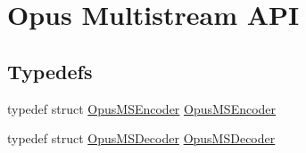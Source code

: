 \hypertarget{group__opus__multistream}{}\section{Opus Multistream A\+PI}
\label{group__opus__multistream}
\subsection*{Typedefs}
\begin{DoxyCompactItemize}
\item 
typedef struct \hyperlink{group__opus__multistream_gae5826674d142fc873ebc1d781c507dd7}{Opus\+M\+S\+Encoder} \hyperlink{group__opus__multistream_gae5826674d142fc873ebc1d781c507dd7}{Opus\+M\+S\+Encoder}
\item 
typedef struct \hyperlink{group__opus__multistream_gad3497495deb9a8ace82e76cd4f93e0e4}{Opus\+M\+S\+Decoder} \hyperlink{group__opus__multistream_gad3497495deb9a8ace82e76cd4f93e0e4}{Opus\+M\+S\+Decoder}
\end{DoxyCompactItemize}
